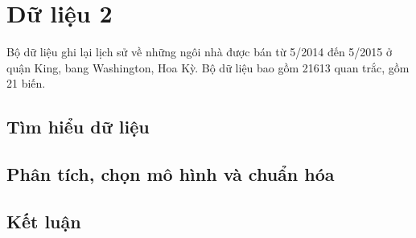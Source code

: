 \section{Dữ liệu 2}
Bộ dữ liệu ghi lại lịch sử về những ngôi nhà được bán từ 5/2014 đến 5/2015 ở quận King, bang Washington, Hoa Kỳ. Bộ dữ liệu bao gồm 21613 quan trắc, gồm 21 biến.

\subsection*{Tìm hiểu dữ liệu}



\subsection*{Phân tích, chọn mô hình và chuẩn hóa}



\subsection*{Kết luận}